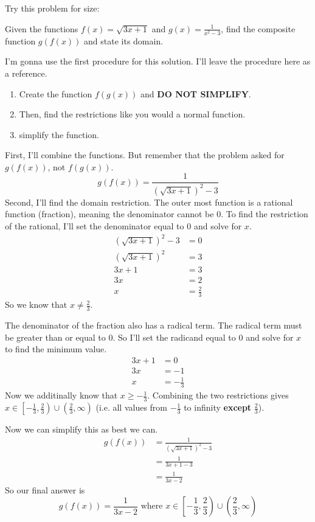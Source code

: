 Try this problem for size:
\begin{problem}
    Given the functions $f(x) = \sqrt{3x + 1}$ and $g(x) = \frac{1}{x^2 - 3}$, find the composite function $g(f(x))$ and state its domain.
\end{problem}

\begin{solution}
    I'm gonna use the first procedure for this solution. I'll leave the procedure here as a reference.
    \begin{enumerate}
        \item Create the function $f(g(x))$ and \textbf{DO NOT SIMPLIFY}.
        \item Then, find the restrictions like you would a normal function.
        \item simplify the function.
    \end{enumerate}

    First, I'll combine the functions. But remember that the problem asked for $g(f(x))$, not $f(g(x))$.
    \[
        g(f(x)) = \frac{1}{\left(\sqrt{3x + 1} \right)^2 - 3}
    \]
    Second, I'll find the domain restriction. The outer most function is a rational function (fraction), meaning the denominator cannot be $0$. To find the restriction of the rational, I'll set the denominator equal to $0$ and solve for $x$.
    \begin{align*}
        \left(\sqrt{3x + 1} \right)^2 - 3 &= 0 \\
        \left(\sqrt{3x + 1} \right)^2 &= 3 \\
        3x + 1 &= 3 \\
        3x &= 2 \\
        x &= \frac{2}{3}
    \end{align*}
    So we know that $x \neq \frac{2}{3}$.

    The denominator of the fraction also has a radical term. The radical term must be greater than or equal to $0$. So I'll set the radicand equal to $0$ and solve for $x$ to find the minimum value.
    \begin{align*}
        3x + 1 &= 0 \\
        3x &= -1 \\
        x &= -\frac{1}{3}
    \end{align*}
    Now we additinally know that $x \ge -\frac{1}{3}$. Combining the two restrictions gives $x \in \left[-\frac{1}{3}, \frac{2}{3} \right) \cup \left(\frac{2}{3}, \infty \right)$ (i.e. all values from $-\frac{1}{3}$ to infinity \textbf{except} $\frac{2}{3}$).

    Now we can simplify this as best we can.
    \begin{align*}
        g(f(x)) &= \frac{1}{\left(\sqrt{3x + 1} \right)^2 - 3} \\
        &= \frac{1}{3x + 1 - 3} \\
        &= \frac{1}{3x - 2}
    \end{align*}
    So our final answer is
    \[
        g(f(x)) = \frac{1}{3x - 2} \text{ where } x \in \left[-\frac{1}{3}, \frac{2}{3} \right) \cup \left(\frac{2}{3}, \infty \right)
    \]
\end{solution}